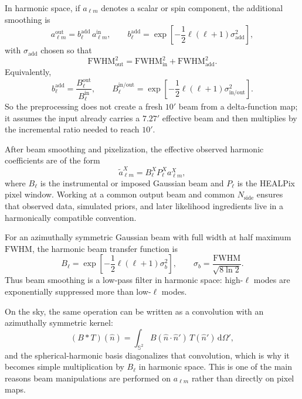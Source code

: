 \documentclass[11pt]{article}
\newcommand{\dd}{\mathrm{d}}
\begin{document}
In harmonic space, if \(a_{\ell m}\) denotes a scalar or spin component, the additional smoothing is
\begin{equation}
  a_{\ell m}^{\mathrm{out}} = b_\ell^{\mathrm{add}}\, a_{\ell m}^{\mathrm{in}},
  \qquad
  b_\ell^{\mathrm{add}} = \exp\!\left[-\frac12 \ell(\ell+1)\sigma_{\mathrm{add}}^2\right],
\end{equation}
with \(\sigma_{\mathrm{add}}\) chosen so that
\begin{equation}
  \mathrm{FWHM}_{\mathrm{out}}^2
  =
  \mathrm{FWHM}_{\mathrm{in}}^2
  +
  \mathrm{FWHM}_{\mathrm{add}}^2.
\end{equation}
Equivalently,
\begin{equation}
  b_\ell^{\mathrm{add}}
  =
  \frac{B_\ell^{\mathrm{out}}}{B_\ell^{\mathrm{in}}},
  \qquad
  B_\ell^{\mathrm{in/out}}
  =
  \exp\!\left[-\frac12 \ell(\ell+1)\sigma_{\mathrm{in/out}}^2\right].
\end{equation}
So the preprocessing does not create a fresh \(10'\) beam from a delta-function map; it assumes the input already carries a \(7.27'\) effective beam and then multiplies by the incremental ratio needed to reach \(10'\).

After beam smoothing and pixelization, the effective observed harmonic coefficients are of the form
\begin{equation}
  \tilde a_{\ell m}^X = B_\ell^X P_\ell^X a_{\ell m}^X,
\end{equation}
where \(B_\ell\) is the instrumental or imposed Gaussian beam and \(P_\ell\) is the HEALPix pixel window. Working at a common output beam and common \(N_{\mathrm{side}}\) ensures that observed data, simulated priors, and later likelihood ingredients live in a harmonically compatible convention.

For an azimuthally symmetric Gaussian beam with full width at half maximum \(\mathrm{FWHM}\), the harmonic beam transfer function is
\begin{equation}
  B_\ell = \exp\!\left[-\frac12 \ell(\ell+1)\sigma_b^2\right],
  \qquad
  \sigma_b = \frac{\mathrm{FWHM}}{\sqrt{8\ln 2}}.
\end{equation}
Thus beam smoothing is a low-pass filter in harmonic space: high-\(\ell\) modes are exponentially suppressed more than low-\(\ell\) modes.

On the sky, the same operation can be written as a convolution with an azimuthally symmetric kernel:
\begin{equation}
  (B\ast T)(\hat n)
  =
  \int_{\mathbb S^2} B(\hat n\!\cdot\!\hat n')\,T(\hat n')\,\dd\Omega',
\end{equation}
and the spherical-harmonic basis diagonalizes that convolution, which is why it becomes simple multiplication by \(B_\ell\) in harmonic space. This is one of the main reasons beam manipulations are performed on \(a_{\ell m}\) rather than directly on pixel maps.
\end{document}
